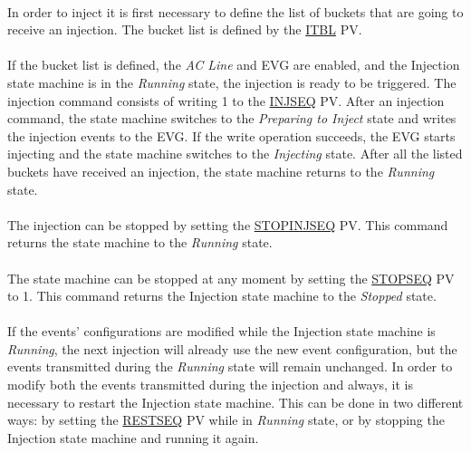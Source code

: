 \documentclass[openany]{article}
\begin{document}
		\paragraph{} In order to inject it is first necessary to define the list of buckets that are going to receive an injection. The bucket list is defined by the \hyperref[pvgroup:evg-injection]{ITBL} PV.
		\paragraph{} If the bucket list is defined, the \emph{AC Line} and EVG are enabled, and the Injection state machine is in the \emph{Running} state, the injection is ready to be triggered. The injection command consists of writing 1 to the \hyperref[pvgroup:evg-injection]{INJSEQ} PV. After an injection command, the state machine switches to the \emph{Preparing to Inject} state and writes the injection events to the EVG. If the write operation succeeds, the EVG starts injecting and the state machine switches to the \emph{Injecting} state. After all the listed buckets have received an injection, the state machine returns to the \emph{Running} state.
		\paragraph{} The injection can be stopped by setting the \hyperref[pvgroup:evg-event]{STOPINJSEQ} PV. This command returns the state machine to the \emph{Running} state.
		\paragraph{} The state machine can be stopped at any moment by setting the \hyperref[pvgroup:evg-event]{STOPSEQ} PV to 1. This command returns the Injection state machine to the \emph{Stopped} state.
		\paragraph{} If the events' configurations are modified while the Injection state machine is \emph{Running}, the next injection will already use the new event configuration, but the events transmitted during the \emph{Running} state will remain unchanged. In order to modify both the events transmitted during the injection and always, it is necessary to restart the Injection state machine. This can be done in two different ways: by setting the \hyperref[pvgroup:evg-event]{RESTSEQ} PV while in \emph{Running} state, or by stopping the Injection state machine and running it again.
\end{document}
